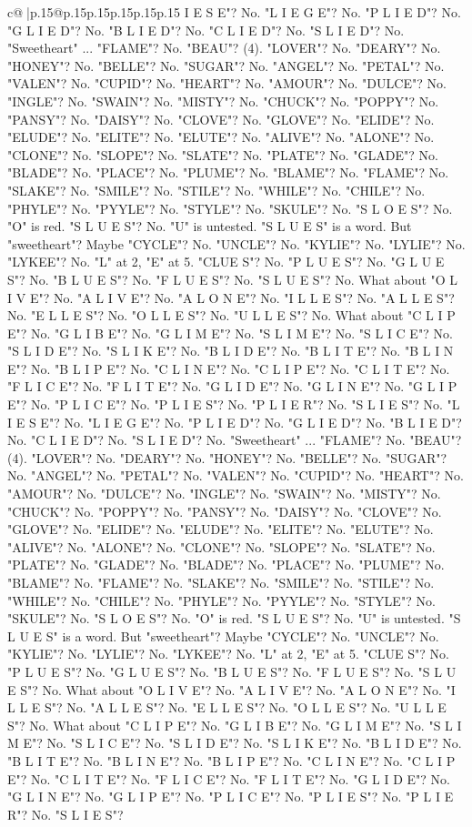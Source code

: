 \documentclass{article}
\begin{document}
{\begin{supertabular}{c@{$\;$}|p{.15\linewidth}@{}p{.15\linewidth}p{.15\linewidth}p{.15\linewidth}p{.15\linewidth}p{.15\linewidth}}
{{{I E S E"? No. "L I E G E"? No. "P L I E D"? No. "G L I E D"? No. "B L I E D"? No. "C L I E D"? No. "S L I E D"? No. "Sweetheart" ... "FLAME"? No. "BEAU"? (4). "LOVER"? No. "DEARY"? No. "HONEY"? No. "BELLE"? No. "SUGAR"? No. "ANGEL"? No. "PETAL"? No. "VALEN"? No. "CUPID"? No. "HEART"? No. "AMOUR"? No. "DULCE"? No. "INGLE"? No. "SWAIN"? No. "MISTY"? No. "CHUCK"? No. "POPPY"? No. "PANSY"? No. "DAISY"? No. "CLOVE"? No. "GLOVE"? No. "ELIDE"? No. "ELUDE"? No. "ELITE"? No. "ELUTE"? No. "ALIVE"? No. "ALONE"? No. "CLONE"? No. "SLOPE"? No. "SLATE"? No. "PLATE"? No. "GLADE"? No. "BLADE"? No. "PLACE"? No. "PLUME"? No. "BLAME"? No. "FLAME"? No. "SLAKE"? No. "SMILE"? No. "STILE"? No. "WHILE"? No. "CHILE"? No. "PHYLE"? No. "PYYLE"? No. "STYLE"? No. "SKULE"? No. "S L O E S"? No. "O" is red. "S L U E S"? No. "U" is untested. "S L U E S" is a word. But "sweetheart"? Maybe "CYCLE"? No. "UNCLE"? No. "KYLIE"? No. "LYLIE"? No. "LYKEE"? No. "L" at 2, "E" at 5. "CLUE S"? No. "P L U E S"? No. "G L U E S"? No. "B L U E S"? No. "F L U E S"? No. "S L U E S"? No. What about "O L I V E"? No. "A L I V E"? No. "A L O N E"? No. "I L L E S"? No. "A L L E S"? No. "E L L E S"? No. "O L L E S"? No. "U L L E S"? No. What about "C L I P E"? No. "G L I B E"? No. "G L I M E"? No. "S L I M E"? No. "S L I C E"? No. "S L I D E"? No. "S L I K E"? No. "B L I D E"? No. "B L I T E"? No. "B L I N E"? No. "B L I P E"? No. "C L I N E"? No. "C L I P E"? No. "C L I T E"? No. "F L I C E"? No. "F L I T E"? No. "G L I D E"? No. "G L I N E"? No. "G L I P E"? No. "P L I C E"? No. "P L I E S"? No. "P L I E R"? No. "S L I E S"? No. "L I E S E"? No. "L I E G E"? No. "P L I E D"? No. "G L I E D"? No. "B L I E D"? No. "C L I E D"? No. "S L I E D"? No. "Sweetheart" ... "FLAME"? No. "BEAU"? (4). "LOVER"? No. "DEARY"? No. "HONEY"? No. "BELLE"? No. "SUGAR"? No. "ANGEL"? No. "PETAL"? No. "VALEN"? No. "CUPID"? No. "HEART"? No. "AMOUR"? No. "DULCE"? No. "INGLE"? No. "SWAIN"? No. "MISTY"? No. "CHUCK"? No. "POPPY"? No. "PANSY"? No. "DAISY"? No. "CLOVE"? No. "GLOVE"? No. "ELIDE"? No. "ELUDE"? No. "ELITE"? No. "ELUTE"? No. "ALIVE"? No. "ALONE"? No. "CLONE"? No. "SLOPE"? No. "SLATE"? No. "PLATE"? No. "GLADE"? No. "BLADE"? No. "PLACE"? No. "PLUME"? No. "BLAME"? No. "FLAME"? No. "SLAKE"? No. "SMILE"? No. "STILE"? No. "WHILE"? No. "CHILE"? No. "PHYLE"? No. "PYYLE"? No. "STYLE"? No. "SKULE"? No. "S L O E S"? No. "O" is red. "S L U E S"? No. "U" is untested. "S L U E S" is a word. But "sweetheart"? Maybe "CYCLE"? No. "UNCLE"? No. "KYLIE"? No. "LYLIE"? No. "LYKEE"? No. "L" at 2, "E" at 5. "CLUE S"? No. "P L U E S"? No. "G L U E S"? No. "B L U E S"? No. "F L U E S"? No. "S L U E S"? No. What about "O L I V E"? No. "A L I V E"? No. "A L O N E"? No. "I L L E S"? No. "A L L E S"? No. "E L L E S"? No. "O L L E S"? No. "U L L E S"? No. What about "C L I P E"? No. "G L I B E"? No. "G L I M E"? No. "S L I M E"? No. "S L I C E"? No. "S L I D E"? No. "S L I K E"? No. "B L I D E"? No. "B L I T E"? No. "B L I N E"? No. "B L I P E"? No. "C L I N E"? No. "C L I P E"? No. "C L I T E"? No. "F L I C E"? No. "F L I T E"? No. "G L I D E"? No. "G L I N E"? No. "G L I P E"? No. "P L I C E"? No. "P L I E S"? No. "P L I E R"? No. "S L I E S"? }}}
\end{supertabular}}
\end{document}

